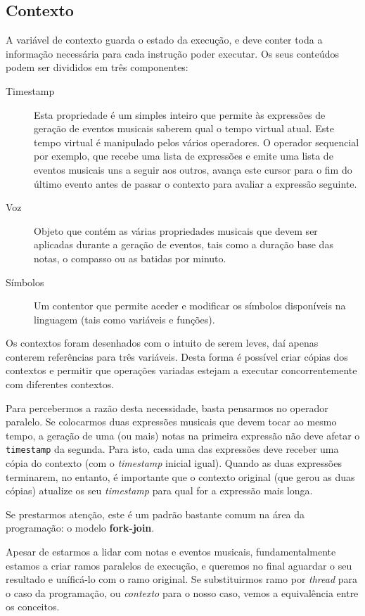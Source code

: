\subsection{Contexto}
A variável de contexto guarda o estado da execução, e deve conter toda a informação necessária para cada instrução poder executar. Os seus conteúdos podem ser divididos em três componentes:
\begin{description}
 \item[Timestamp] Esta propriedade é um simples inteiro que permite às expressões de geração de eventos musicais saberem qual o tempo virtual atual. Este tempo virtual é manipulado pelos vários operadores. O operador sequencial por exemplo, que recebe uma lista de expressões e emite uma lista de eventos musicais uns a seguir aos outros, avança este cursor para o fim do último evento antes de passar o contexto para avaliar a expressão seguinte.
 \item[Voz] Objeto que contém as várias propriedades musicais que devem ser aplicadas durante a geração de eventos, tais como a duração base das notas, o compasso ou as batidas por minuto.
 \item[Símbolos] Um contentor que permite aceder e modificar os símbolos disponíveis na linguagem (tais como variáveis e funções).
 \end{description}
 
 Os contextos foram desenhados com o intuito de serem leves, daí apenas conterem  referências para três variáveis. Desta forma é possível criar cópias dos contextos e permitir que operações variadas estejam a executar concorrentemente com diferentes contextos.
 
 Para percebermos a razão desta necessidade, basta pensarmos no operador paralelo. Se colocarmos duas expressões musicais que devem tocar ao mesmo tempo, a geração de uma (ou mais) notas na primeira expressão não deve afetar o \texttt{timestamp} da segunda. Para isto, cada uma das expressões deve receber uma cópia do contexto (com o \textit{timestamp} inicial igual). Quando as duas expressões terminarem, no entanto, é importante que o contexto original (que gerou as duas cópias) atualize os seu \textit{timestamp} para qual for a expressão mais longa.
 
 Se prestarmos atenção, este é um padrão bastante comum na área da programação: o modelo \textbf{fork-join}.
 
 Apesar de estarmos a lidar com notas e eventos musicais, fundamentalmente estamos a criar ramos paralelos de execução, e queremos no final aguardar o seu resultado e uníficá-lo com o ramo original. Se substituirmos ramo por \textit{thread} para o caso da programação, ou \textit{contexto} para o nosso caso, vemos a equivalência entre os conceitos.
 
